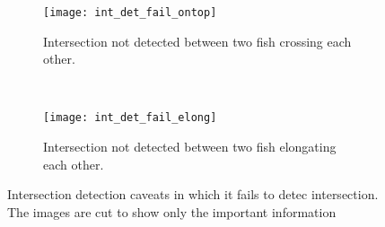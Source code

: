 \begin{figure}[H]
	\centering
	\begin{subfigure}{0.45\textwidth}
		\texttt{[image: int\_det\_fail\_ontop]}
		\caption{Intersection not detected between two fish crossing each other. }
		\label{fig:int_det_fail_ontop}
	\end{subfigure}
~
	\begin{subfigure}{0.45\textwidth}
		\texttt{[image: int\_det\_fail\_elong]}
		\caption{Intersection not detected between two fish elongating each other. }
		\label{fig:int_det_fail_elong}
	\end{subfigure}
	\caption{Intersection detection caveats in which it fails to detec intersection. The images are cut to show only the important information}
	\label{fig:int_det_fail}
\end{figure}

